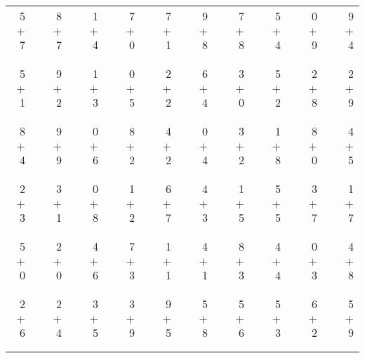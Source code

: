 \documentclass[12pt, letterpaper]{article}
\begin{document}
\begin{tabular}{rrrrrrrrrrrrrrrrrrr}
5 & & 8 & & 1 & & 7 & & 7 & & 9 & & 7 & & 5 & & 0 & & 9\\
$+$ 7 & & $+$ 7 & & $+$ 4 & & $+$ 0 & & $+$ 1 & & $+$ 8 & & $+$ 8 & & $+$ 4 & & $+$ 9 & & $+$ 4\\
\cline{1-1} \cline{3-3} \cline{5-5} \cline{7-7} \cline{9-9} \cline{11-11} \cline{13-13} \cline{15-15} \cline{17-17} \cline{19-19} \\ \\
5 & & 9 & & 1 & & 0 & & 2 & & 6 & & 3 & & 5 & & 2 & & 2\\
$+$ 1 & & $+$ 2 & & $+$ 3 & & $+$ 5 & & $+$ 2 & & $+$ 4 & & $+$ 0 & & $+$ 2 & & $+$ 8 & & $+$ 9\\
\cline{1-1} \cline{3-3} \cline{5-5} \cline{7-7} \cline{9-9} \cline{11-11} \cline{13-13} \cline{15-15} \cline{17-17} \cline{19-19} \\ \\
8 & & 9 & & 0 & & 8 & & 4 & & 0 & & 3 & & 1 & & 8 & & 4\\
$+$ 4 & & $+$ 9 & & $+$ 6 & & $+$ 2 & & $+$ 2 & & $+$ 4 & & $+$ 2 & & $+$ 8 & & $+$ 0 & & $+$ 5\\
\cline{1-1} \cline{3-3} \cline{5-5} \cline{7-7} \cline{9-9} \cline{11-11} \cline{13-13} \cline{15-15} \cline{17-17} \cline{19-19} \\ \\
2 & & 3 & & 0 & & 1 & & 6 & & 4 & & 1 & & 5 & & 3 & & 1\\
$+$ 3 & & $+$ 1 & & $+$ 8 & & $+$ 2 & & $+$ 7 & & $+$ 3 & & $+$ 5 & & $+$ 5 & & $+$ 7 & & $+$ 7\\
\cline{1-1} \cline{3-3} \cline{5-5} \cline{7-7} \cline{9-9} \cline{11-11} \cline{13-13} \cline{15-15} \cline{17-17} \cline{19-19} \\ \\
5 & & 2 & & 4 & & 7 & & 1 & & 4 & & 8 & & 4 & & 0 & & 4\\
$+$ 0 & & $+$ 0 & & $+$ 6 & & $+$ 3 & & $+$ 1 & & $+$ 1 & & $+$ 3 & & $+$ 4 & & $+$ 3 & & $+$ 8\\
\cline{1-1} \cline{3-3} \cline{5-5} \cline{7-7} \cline{9-9} \cline{11-11} \cline{13-13} \cline{15-15} \cline{17-17} \cline{19-19} \\ \\
2 & & 2 & & 3 & & 3 & & 9 & & 5 & & 5 & & 5 & & 6 & & 5\\
$+$ 6 & & $+$ 4 & & $+$ 5 & & $+$ 9 & & $+$ 5 & & $+$ 8 & & $+$ 6 & & $+$ 3 & & $+$ 2 & & $+$ 9\\
\cline{1-1} \cline{3-3} \cline{5-5} \cline{7-7} \cline{9-9} \cline{11-11} \cline{13-13} \cline{15-15} \cline{17-17} \cline{19-19} \\ \\

\end{tabular}
\end{document}
